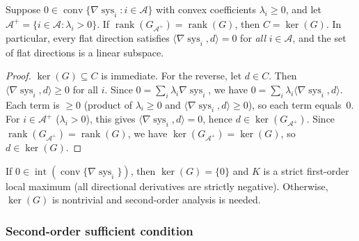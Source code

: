 \begin{lemma}\label{lem:cone-equals-kernel}
  Suppose $0 \in \operatorname{conv}\{\nabla\operatorname{sys}_i : i \in \mathcal{A}\}$
  with convex coefficients $\lambda_i \geq 0$, and let
  $\mathcal{A}^+ = \{i \in \mathcal{A} : \lambda_i > 0\}$.
  If $\operatorname{rank}(G_{\mathcal{A}^+}) = \operatorname{rank}(G)$,
  then $C = \ker(G)$.
  In particular, every flat direction satisfies
  $\langle \nabla\operatorname{sys}_i, d \rangle = 0$
  for \emph{all} $i \in \mathcal{A}$, and the set of flat directions
  is a linear subspace.
\end{lemma}
\begin{proof}
  $\ker(G) \subseteq C$ is immediate. For the reverse, let $d \in C$.
  Then $\langle \nabla\operatorname{sys}_i, d \rangle \geq 0$ for all $i$.
  Since $0 = \sum_i \lambda_i \nabla\operatorname{sys}_i$, we have
  $0 = \sum_i \lambda_i \langle \nabla\operatorname{sys}_i, d \rangle$.
  Each term is $\geq 0$ (product of $\lambda_i \geq 0$ and
  $\langle \nabla\operatorname{sys}_i, d \rangle \geq 0$), so each term
  equals~$0$. For $i \in \mathcal{A}^+$ ($\lambda_i > 0$), this gives
  $\langle \nabla\operatorname{sys}_i, d \rangle = 0$, hence
  $d \in \ker(G_{\mathcal{A}^+})$.
  Since $\operatorname{rank}(G_{\mathcal{A}^+}) = \operatorname{rank}(G)$,
  we have $\ker(G_{\mathcal{A}^+}) = \ker(G)$, so $d \in \ker(G)$.
\end{proof}

If $0 \in \operatorname{int}(\operatorname{conv}\{\nabla\operatorname{sys}_i\})$,
then $\ker(G) = \{0\}$ and $K$ is a strict first-order local maximum
(all directional derivatives are strictly negative).
Otherwise, $\ker(G)$ is nontrivial and second-order analysis is needed.

\subsubsection{Second-order sufficient condition}

